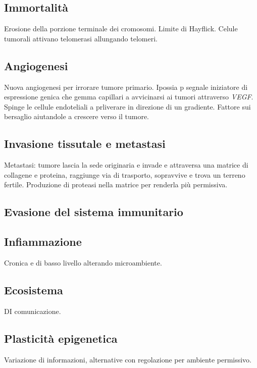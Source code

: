 	\subsection{Immortalit\`a}
	Erosione della porzione terminale dei cromosomi.
	Limite di Hayflick.
	Celule tumorali attivano telomerasi allungando telomeri.

	\subsection{Angiogenesi}
	Nuova angiogenesi per irrorare tumore primario.
	Ipossia p segnale iniziatore di espressione genica che gemma capillari a avvicinarsi ai tumori attraverso \emph{VEGF}.
	Spinge le cellule endoteliali a prliverare in direzione di un gradiente.
	Fattore sui bersaglio aiutandole a crescere verso il tumore.

	\subsection{Invasione tissutale e metastasi}
	Metastasi: tumore lascia la sede originaria e invade e attraversa una matrice di collagene e proteina, raggiunge via di trasporto, sopravvive e trova un terreno fertile.
	Produzione di proteasi nella matrice per renderla pi\`u permissiva.

	\subsection{Evasione del sistema immunitario}

	\subsection{Infiammazione}
	Cronica e di basso livello alterando microambiente.

	\subsection{Ecosistema}
	DI comunicazione.

	\subsection{Plasticit\`a epigenetica}
	Variazione di informazioni, alternative con regolazione per ambiente permissivo.

